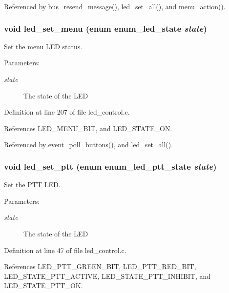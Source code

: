 Referenced by bus\_\-resend\_\-message(), led\_\-set\_\-all(), and menu\_\-action().
\subsubsection[{led\_\-set\_\-menu}]{\setlength{\rightskip}{0pt plus 5cm}void led\_\-set\_\-menu (enum {\bf enum\_\-led\_\-state} {\em state})}\label{led__control_8c_f3e320269d62c70597b7d7eb457cb29e}


Set the menu LED status. 

\begin{Desc}
\item[Parameters:]
\begin{description}
\item[{\em state}]The state of the LED \end{description}
\end{Desc}


Definition at line 207 of file led\_\-control.c.

References LED\_\-MENU\_\-BIT, and LED\_\-STATE\_\-ON.

Referenced by event\_\-poll\_\-buttons(), and led\_\-set\_\-all().
\subsubsection[{led\_\-set\_\-ptt}]{\setlength{\rightskip}{0pt plus 5cm}void led\_\-set\_\-ptt (enum {\bf enum\_\-led\_\-ptt\_\-state} {\em state})}\label{led__control_8c_995815f6cfca1616b4bbec84ba4bc27c}


Set the PTT LED. 

\begin{Desc}
\item[Parameters:]
\begin{description}
\item[{\em state}]The state of the LED \end{description}
\end{Desc}


Definition at line 47 of file led\_\-control.c.

References LED\_\-PTT\_\-GREEN\_\-BIT, LED\_\-PTT\_\-RED\_\-BIT, LED\_\-STATE\_\-PTT\_\-ACTIVE, LED\_\-STATE\_\-PTT\_\-INHIBIT, and LED\_\-STATE\_\-PTT\_\-OK.

